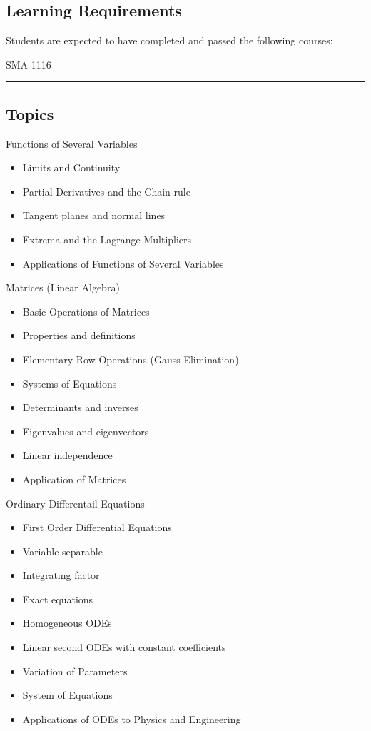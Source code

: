 \subsection*{Learning Requirements}
Students are expected to have completed and passed the following courses:
\begin{outline}
    \1      SMA 1116

\end{outline}
\vspace{2ex}\hrule\vspace{2ex}

\subsection*{Topics}
\begin{outline}
    \1 Functions of Several Variables
    \begin{itemize}
        \item Limits and Continuity
        \item Partial Derivatives and the Chain rule
        \item Tangent planes and normal lines
        \item Extrema and the Lagrange Multipliers
        \item Applications of Functions of Several Variables
    \end{itemize}
    \1 Matrices (Linear Algebra)
    \begin{itemize}
        \item Basic Operations of Matrices
        \item Properties and definitions
        \item Elementary Row Operations (Gauss Elimination)
        \item Systems of Equations
        \item Determinants and inverses
        \item Eigenvalues and eigenvectors
        \item Linear independence
        \item Application of Matrices
    \end{itemize}
    \1 Ordinary Differentail Equations
    \begin{itemize}
        \item First Order Differential Equations
        \item Variable separable
        \item Integrating factor
        \item Exact equations
        \item Homogeneous ODEs
        \item Linear second ODEs with constant coefficients
        \item Variation of Parameters
        \item System of Equations
        \item Applications of ODEs to Physics and Engineering
    \end{itemize}
\end{outline}
